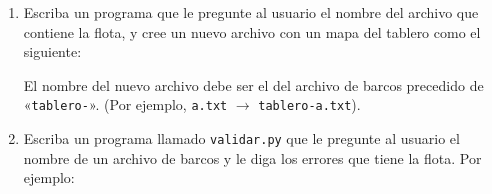 \newpage

\begin{enumerate}[leftmargin=0pt,label=\emph{\alph*})]

  \item
    Escriba un programa %
    que le pregunte al usuario
    el nombre del archivo que contiene la flota,
    y cree un nuevo archivo con un mapa del tablero
    como el siguiente:

    \begin{minipage}[t]{0.45\textwidth}
      
    \end{minipage}

    El nombre del nuevo archivo debe ser el del archivo de barcos
    precedido de «\verb+tablero-+».
    (Por ejemplo, \verb+a.txt+ \(\to\) \verb+tablero-a.txt+).



  \newpage
  \item
    Escriba un programa llamado \verb+validar.py+
    que le pregunte al usuario el nombre de un archivo de barcos
    y le diga los errores que tiene la flota.
    Por ejemplo:
    

\end{enumerate}

